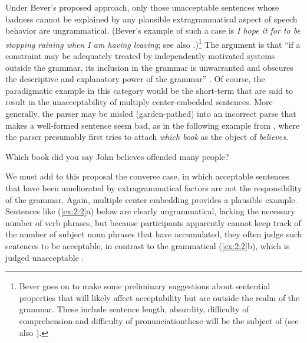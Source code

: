 Under Bever's proposed approach, only those unacceptable sentences whose badness cannot be explained by any plausible extragrammatical aspect of speech behavior are ungrammatical. (Bever's example of such a case is \textit{I hope it for to be stopping raining when I am having leaving}; see also \citealt{Bever1971}.)\footnote{Bever goes on to make some preliminary suggestions about sentential properties that will likely affect acceptability but are outside the realm of the grammar. These include sentence length, absurdity, difficulty of comprehension and difficulty of pronunciation\schdash{}these will be the subject of  (see also \citealt{KatzEtAl1976}).}
 The argument is that ``if a constraint may be adequately treated by independently motivated systems outside the grammar, its inclusion in the grammar is unwarranted and obscures the descriptive and explanatory power of the grammar'' \citep[150]{BeverEtAl1976a}. Of course, the paradigmatic example in this category would be the short-term  that are said to result in the unacceptability of multiply center-embedded sentences. More generally, the parser may be misled (garden-pathed) into an incorrect parse that makes a well-formed sentence seem bad, as in the following example from \citet{Ellis1991}, where the
parser presumably first tries to attach \textit{which book} as the object of \textit{believes}.

\ea \label{ex:2:1}
    Which book did you say John believes offended many people?
\z



We must add to this proposal the converse case, in which acceptable sentences that have been ameliorated by extragrammatical factors are not the responsibility of the grammar. Again, multiple center embedding provides a plausible example. Sentences like (\ref{ex:2:2}a) below are clearly ungrammatical, lacking the necessary number of verb phrases, but because participants apparently cannot keep track of the number of subject noun phrases that have accumulated, they often judge such sentences to be acceptable, in contrast to the grammatical (\ref{ex:2:2}b), which is judged unacceptable \citep{Frazier1985}.

